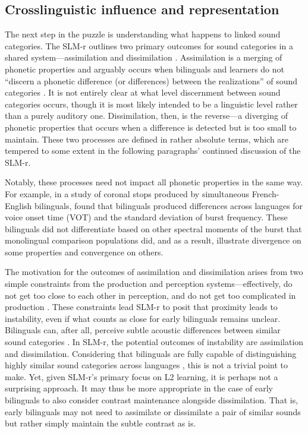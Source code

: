 \subsection{Crosslinguistic influence and representation}\label{ch4:sec:cli}

The next step in the puzzle is understanding what happens to linked sound categories. The SLM-r outlines two primary outcomes for sound categories in a shared system---assimilation and dissimilation \citep{flege_2021_slmr}. Assimilation is a merging of phonetic properties and arguably occurs when bilinguals and learners do not ``discern a phonetic difference (or differences) between the realizations'' of sound categories \citep[][p. 40]{flege_2021_slmr}. It is not entirely clear at what level discernment between sound categories occurs, though it is most likely intended to be a linguistic level rather than a purely auditory one. Dissimilation, then, is the reverse---a diverging of phonetic properties that occurs when a difference is detected but is too small to maintain. These two processes are defined in rather absolute terms, which are tempered to some extent in the following paragraphs' continued discussion of the SLM-r. 

Notably, these processes need not impact all phonetic properties in the same way. For example, in a study of coronal stops produced by simultaneous French-English bilinguals, \citet{sundara_2006_production} found that bilinguals produced differences across languages for voice onset time (VOT) and the standard deviation of burst frequency. These bilinguals did not differentiate based on other spectral moments of the burst that monolingual comparison populations did, and as a result, \citet{sundara_2006_production} illustrate divergence on some properties and convergence on others. 

The motivation for the outcomes of assimilation and dissimilation arises from two simple constraints from the production and perception systems---effectively, do not get too close to each other in perception, and do not get too complicated in production \citep{guion_2003_systems, lindblom_1988_universals, flege_2021_slmr}. These constraints lead SLM-r to posit that proximity leads to instability, even if what counts as close for early bilinguals remains unclear. Bilinguals can, after all, perceive subtle acoustic differences between similar sound categories \citep{ju_2004_falling}. In SLM-r, the potential outcomes of instability are assimilation and dissimilation. Considering that bilinguals are fully capable of distinguishing highly similar sound categories across languages \citep[e.g.,][]{sundara_2006_production, lein_2016_vot, casillas_2021_interlingual}, this is not a trivial point to make. Yet, given SLM-r's primary focus on L2 learning, it is perhaps not a surprising approach. It may thus be more appropriate in the case of early bilinguals to also consider contrast maintenance alongside dissimilation. That is, early bilinguals may not need to assimilate or dissimilate a pair of similar sounds but rather simply maintain the subtle contrast as is. 


